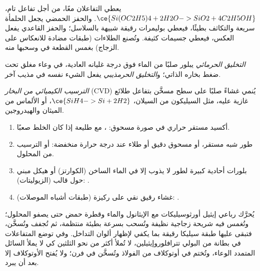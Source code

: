 يعطي التفاعلان معًا، من أجل تفاعل تام،
$\ce{Si(OC2H5)4 + 2H2O -> SiO2 + 4C2H5OH}$. والحفز الحمضي يجعل الحلمأة سريعة 
والتكاثف بطيئًا، فيعطي بوليمرات رقيقة شبيهة بالسلاسل؛ والحفز القاعدي يفعل
العكس، فيعطي جسيمات كثيفة. وتُصنع الطلاءات (طبقات مضادة للانعكاس على الزجاج)
بغمس القطعة في  وسحبها منه.

\begin{definition}\label{def:b3:inorganic-materials:hydrothermal}
\emph{التخليق الحرمائي} يبلور
صلبًا من الماء فوق درجة غليانه العادية، في وعاء مغلق تحت
ضغط بخاره الذاتي؛ و\emph{التخليق الحرمذيبي}
يفعل الشيء نفسه في مذيب آخر.
\end{definition}

\begin{definition}\label{def:b3:inorganic-materials:cvd}
\emph{الترسيب الكيميائي من البخار} (CVD) يُنمي
غشاءً صلبًا على سطح مسخَّن بتفاعل طلائع غازية عليه، مثل
السيليكون من السيلان، $\ce{SiH4 -> Si + 2H2}$، أو الألماس من الميثان والهيدروجين.
\end{definition}

\begin{method}\label{met:b3:inorganic-materials:route}
\begin{enumerate}
  \item أكسيد مستقر حراري في صورة مسحوق: ، مع
        طليعة إذا كان الخلط صعبًا.
  \item طور شبه مستقر، أو مسحوق دقيق أو طلاء عند درجة حرارة منخفضة:
         أو الترسيب من المحلول.
  \item بلورات أحادية كبيرة لطور لا يذوب إلا في الماء الساخن (الكوارتز) أو
        هيكل مبني حول قالب (الزيوليتات): .
  \item غشاء رقيق نقي على ركيزة (طبقات أشباه الموصلات): .
\end{enumerate}
\end{method}

\begin{inthelab}
يُحرَّك رباعي إيثيل أورثوسيليكات مع الإيثانول والماء وقطرة حمض
حتى يصفو المحلول؛ وتُغمس فيه شريحة زجاجية نظيفة وتُسحب
بسرعة بطيئة منتظمة، ثم تُجفف وتُسخَّن، فتبقى عليها طبقة سيليكا رقيقة بما يكفي
لإظهار ألوان التداخل. وفي  توضع المتفاعلات
في بطانة من البولي تترافلوروإيثيلين، لا تُملأ أكثر من نحو الثلثين كي
لا يملأ السائل المتمدد الوعاء، وتُختم في أوتوكلاف من الفولاذ
وتُسخَّن في فرن؛ ولا يُفتح الأوتوكلاف إلا بعد أن يبرد.
\end{inthelab}

